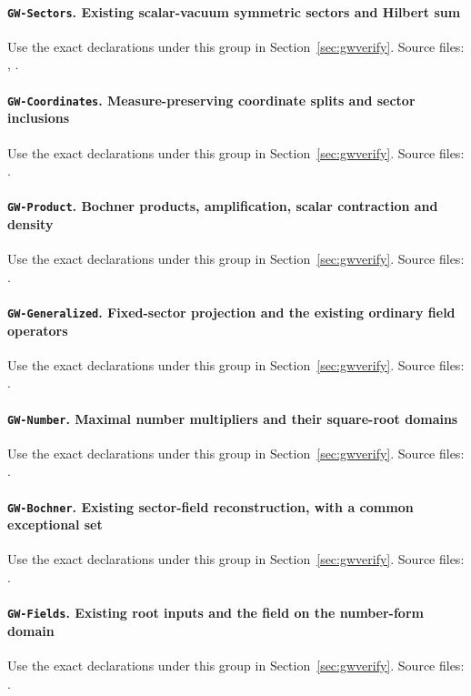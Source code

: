 \documentclass[11pt,a4paper]{article}
\theoremstyle{remark}\newtheorem{remark}[theorem]{Remark}
\begin{document}
\paragraph{\texttt{GW-Sectors}. Existing scalar-vacuum symmetric sectors and Hilbert sum}\label{leaf:GW-Sectors}
Use the exact declarations under this group in Section~\ref{sec:gwverify}. Source files: , .
\paragraph{\texttt{GW-Coordinates}. Measure-preserving coordinate splits and sector inclusions}\label{leaf:GW-Coordinates}
Use the exact declarations under this group in Section~\ref{sec:gwverify}. Source files: .
\paragraph{\texttt{GW-Product}. Bochner products, amplification, scalar contraction and density}\label{leaf:GW-Product}
Use the exact declarations under this group in Section~\ref{sec:gwverify}. Source files: .
\paragraph{\texttt{GW-Generalized}. Fixed-sector projection and the existing ordinary field operators}\label{leaf:GW-Generalized}
Use the exact declarations under this group in Section~\ref{sec:gwverify}. Source files: .
\paragraph{\texttt{GW-Number}. Maximal number multipliers and their square-root domains}\label{leaf:GW-Number}
Use the exact declarations under this group in Section~\ref{sec:gwverify}. Source files: .
\paragraph{\texttt{GW-Bochner}. Existing sector-field reconstruction, with a common exceptional set}\label{leaf:GW-Bochner}
Use the exact declarations under this group in Section~\ref{sec:gwverify}. Source files: .
\paragraph{\texttt{GW-Fields}. Existing root inputs and the field on the number-form domain}\label{leaf:GW-Fields}
Use the exact declarations under this group in Section~\ref{sec:gwverify}. Source files: .
\end{document}
